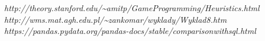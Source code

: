 \documentclass{classrep}
\begin{document}
\begin{thebibliography}{0}
  \textsl{http://theory.stanford.edu/\textasciitilde{}amitp/GameProgramming/Heuristics.html}
  \textsl{http://wms.mat.agh.edu.pl/\textasciitilde{}zankomar/wyklady/Wyklad8.htm}
  \textsl{https://pandas.pydata.org/pandas-docs/stable/comparison\textunderscore{}with\textunderscore{}sql.html}
\end{thebibliography}
\end{document}
